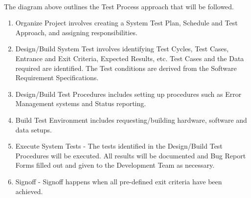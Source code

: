 \documentclass[12pts]{scrreprt}
\begin{document}
\paragraph{}
The diagram above outlines the Test Process approach that will be followed.
\begin{enumerate}
    \item Organize Project involves creating a System Test Plan, Schedule and Test Approach, and assigning responsibilities.
    \item Design/Build System Test involves identifying Test Cycles, Test Cases, Entrance and Exit Criteria, Expected Results, etc. Test Cases and the Data required are identified. The Test conditions are derived from the Software Requirement Specifications.
    \item Design/Build Test Procedures includes setting up procedures such as Error Management systems and Status reporting.
    \item Build Test Environment includes requesting/building hardware, software and data setups.
    \item Execute System Tests - The tests identified in the Design/Build Test Procedures will be executed. All results will be documented and Bug Report Forms filled out and given to the Development Team as necessary.
    \item Signoff - Signoff happens when all pre-defined exit criteria have been achieved.
\end{enumerate}
\end{document}
